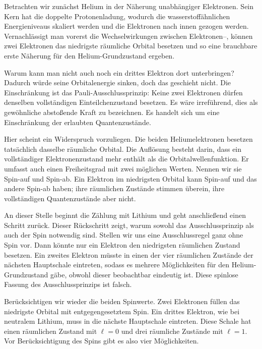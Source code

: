 Betrachten wir zunächst Helium in der Näherung unabhängiger Elektronen. Sein Kern hat die doppelte Protonenladung, wodurch die wasserstoffähnlichen Energieniveaus skaliert werden und die Elektronen nach innen gezogen werden. Vernachlässigt man vorerst die Wechselwirkungen zwischen Elektronen--, können zwei Elektronen das niedrigste räumliche Orbital besetzen und so eine brauchbare erste Näherung für den Helium-Grundzustand ergeben.

Warum kann man nicht auch noch ein drittes Elektron dort unterbringen? Dadurch würde seine Orbitalenergie sinken, doch das geschieht nicht. Die Einschränkung ist das Pauli-Ausschlussprinzip: Keine zwei Elektronen dürfen denselben vollständigen Einteilchenzustand besetzen. Es wäre irreführend, dies als gewöhnliche abstoßende Kraft zu bezeichnen. Es handelt sich um eine Einschränkung der erlaubten Quantenzustände.

Hier scheint ein Widerspruch vorzuliegen. Die beiden Heliumelektronen besetzen tatsächlich dasselbe räumliche Orbital. Die Auflösung besteht darin, dass ein vollständiger Elektronenzustand mehr enthält als die Orbitalwellenfunktion. Er umfasst auch einen Freiheitsgrad mit zwei möglichen Werten. Nennen wir sie Spin-auf und Spin-ab. Ein Elektron im niedrigsten Orbital kann Spin-auf und das andere Spin-ab haben; ihre räumlichen Zustände stimmen überein, ihre vollständigen Quantenzustände aber nicht.

An dieser Stelle beginnt die Zählung mit Lithium und geht anschließend einen Schritt zurück. Dieser Rückschritt zeigt, warum sowohl das Ausschlussprinzip als auch der Spin notwendig sind. Stellen wir uns eine Ausschlussregel ganz ohne Spin vor. Dann könnte nur ein Elektron den niedrigsten räumlichen Zustand besetzen. Ein zweites Elektron müsste in einen der vier räumlichen Zustände der nächsten Hauptschale eintreten, sodass es mehrere Möglichkeiten für den Helium-Grundzustand gäbe, obwohl dieser beobachtbar eindeutig ist. Diese spinlose Fassung des Ausschlussprinzips ist falsch.

Berücksichtigen wir wieder die beiden Spinwerte. Zwei Elektronen füllen das niedrigste Orbital mit entgegengesetztem Spin. Ein drittes Elektron, wie bei neutralem Lithium, muss in die nächste Hauptschale eintreten. Diese Schale hat einen räumlichen Zustand mit \(\ell=0\) und drei räumliche Zustände mit \(\ell=1\). Vor Berücksichtigung des Spins gibt es also vier Möglichkeiten.

\begin{classroomqa}
\end{classroomqa}

